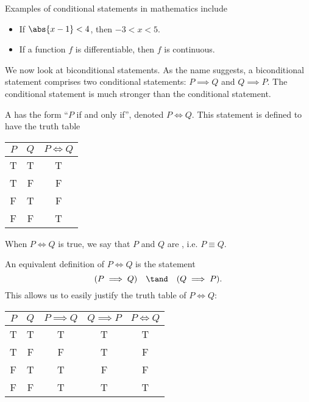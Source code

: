 Examples of conditional statements in mathematics include
\begin{itemize}
    \item If $\abs{x - 1} < 4$, then $-3 < x < 5$.
    \item If a function $f$ is differentiable, then $f$ is continuous.
\end{itemize}

We now look at biconditional statements. As the name suggests, a biconditional statement comprises two conditional statements: $P \implies Q$ and $Q \implies P$. The conditional statement is much stronger than the conditional statement.

\begin{definition}
    A  has the form ``$P$ if and only if'', denoted $P \iff Q$. This statement is defined to have the truth table
    \begin{table}[H]
        \centering
        \begin{tabular}{|c|c|c|}
        \hline
        $P$ & $Q$ & $P \iff Q$ \\ \hline\hline
        T & T & T \\ \hline
        T & F & F \\ \hline
        F & T & F \\ \hline
        F & F & T \\ \hline
        \end{tabular}
    \end{table}

    When $P \iff Q$ is true, we say that $P$ and $Q$ are , i.e. $P \equiv Q$.
\end{definition}

An equivalent definition of $P \iff Q$ is the statement \[(P \implies Q) \quad \tand \quad (Q \implies P).\] This allows us to easily justify the truth table of $P \iff Q$:
\begin{table}[H]
    \centering
    \begin{tabular}{|c|c|c|c|c|}
    \hline
    $P$ & $Q$ & $P \implies Q$ & $Q \implies P$ & $P \iff Q$ \\ \hline\hline
    T & T & T & T & T \\ \hline
    T & F & F & T & F \\ \hline
    F & T & T & F & F \\ \hline
    F & F & T & T & T \\ \hline
    \end{tabular}
\end{table}

